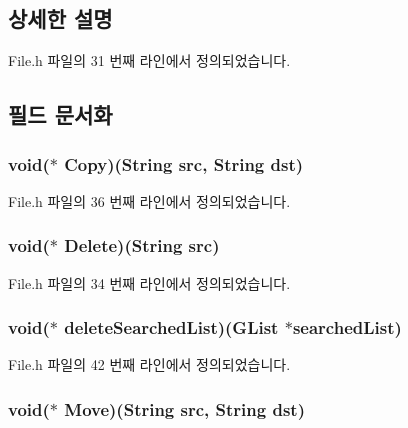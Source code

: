 \subsection{상세한 설명}


File.\-h 파일의 31 번째 라인에서 정의되었습니다.



\subsection{필드 문서화}
\hypertarget{struct___file_a92496803181c17bf9099dd7a8daf15b9}{
\subsubsection[{Copy}]{\setlength{\rightskip}{0pt plus 5cm}void($\ast$  Copy)({\bf String} src, {\bf String} dst)}}\label{struct___file_a92496803181c17bf9099dd7a8daf15b9}


File.\-h 파일의 36 번째 라인에서 정의되었습니다.

\hypertarget{struct___file_a53d84115a9c66fe30c652f908da6d3b7}{
\subsubsection[{Delete}]{\setlength{\rightskip}{0pt plus 5cm}void($\ast$  Delete)({\bf String} src)}}\label{struct___file_a53d84115a9c66fe30c652f908da6d3b7}


File.\-h 파일의 34 번째 라인에서 정의되었습니다.

\hypertarget{struct___file_a688001b808e44b036dac30773decb791}{
\subsubsection[{delete\-Searched\-List}]{\setlength{\rightskip}{0pt plus 5cm}void($\ast$  delete\-Searched\-List)(G\-List $\ast$searched\-List)}}\label{struct___file_a688001b808e44b036dac30773decb791}


File.\-h 파일의 42 번째 라인에서 정의되었습니다.

\hypertarget{struct___file_a7eb122224c5bd93834784151526da9e2}{
\subsubsection[{Move}]{\setlength{\rightskip}{0pt plus 5cm}void($\ast$  Move)({\bf String} src, {\bf String} dst)}}\label{struct___file_a7eb122224c5bd93834784151526da9e2}



